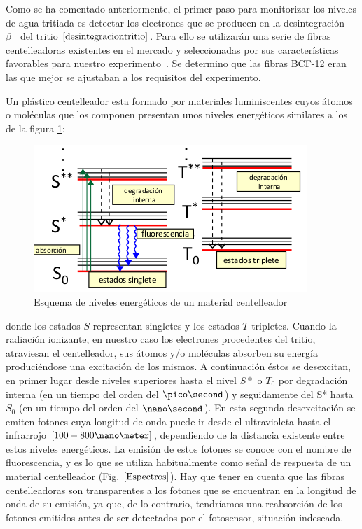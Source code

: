 Como se ha comentado anteriormente, el primer paso para monitorizar los niveles de agua tritiada es detectar los electrones que se producen en la desintegración $\beta^-$ del tritio $\eqref{desintegraciontritio}$. Para ello se utilizarán una serie de fibras centelleadoras existentes en el mercado y seleccionadas por sus características favorables para nuestro experimento~\cite{Alberto}.  Se determino que las fibras BCF-12 eran las que mejor se ajustaban a los requisitos del experimento. 

Un plástico centelleador esta formado por materiales luminiscentes cuyos átomos o moléculas que los componen presentan unos niveles energéticos similares a los de la figura \ref{Esquemafibras}:

\begin{figure}[hbtp]
\centering
\includegraphics[scale=0.7]{EsquemaNivelesFIbras.png}
\caption{Esquema de niveles energéticos de un material centelleador~\cite{asignatura}\label{Esquemafibras}
}
\end{figure}
donde los estados $S$ representan singletes y los estados $T$ tripletes. Cuando la radiación ionizante, en nuestro caso los electrones procedentes del tritio,  atraviesan el centelleador, sus átomos y/o moléculas absorben su energía produciéndose una excitación de los mismos. 
A continuación éstos se desexcitan, en primer lugar desde niveles superiores hasta el nivel $S*$ o $T_0$ por degradación interna (en un tiempo del orden del $\pico\second$) y seguidamente del S* hasta $S_0$ (en un tiempo del orden del $\nano\second$). En esta segunda desexcitación se emiten fotones cuya longitud de onda puede ir desde el ultravioleta hasta el infrarrojo $[100-800 \nano\meter]$, dependiendo de la distancia existente entre estos niveles energéticos. La emisión de estos fotones se conoce con el nombre de  fluorescencia, y es lo que se utiliza habitualmente como señal de respuesta de un material centelleador (Fig. $\ref{Espectros}$).
Hay que tener en cuenta que las fibras centelleadoras son transparentes a los fotones que se encuentran en la longitud de onda de su emisión, ya que, de lo contrario, tendríamos una reabsorción de los fotones emitidos antes de ser detectados por el fotosensor, situación indeseada.

